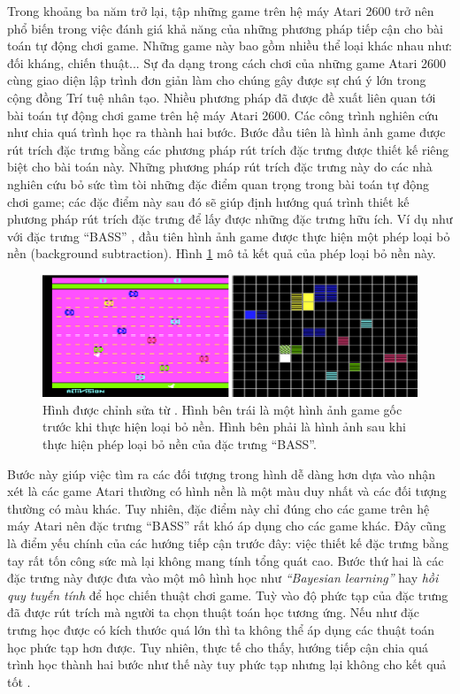 Trong khoảng ba năm trở lại, tập những game trên hệ máy Atari 2600 trở nên phổ biến trong việc đánh giá khả năng của những phương pháp tiếp cận cho bài toán tự động chơi game.
Những game này bao gồm nhiều thể loại khác nhau như: đối kháng, chiến thuật...
Sự đa dạng trong cách chơi của những game Atari 2600 cùng giao diện lập trình đơn giản làm cho chúng gây được sự chú ý lớn trong cộng đồng Trí tuệ nhân tạo.
Nhiều phương pháp đã được đề xuất liên quan tới bài toán tự động chơi game trên hệ máy Atari 2600. 
Các công trình nghiên cứu như \cite{bellemare2013bayesian, icml2014c2_bellemare14, bellemare2012arcade} chia quá trình học ra thành hai bước.
Bước đầu tiên là hình ảnh game được rút trích đặc trưng bằng các phương pháp rút trích đặc trưng được thiết kế riêng biệt cho bài toán này.
Những phương pháp rút trích đặc trưng này do các nhà nghiên cứu bỏ sức tìm tòi những đặc điểm quan trọng trong bài toán tự động chơi game; các đặc điểm này sau đó sẽ giúp định hướng quá trình thiết kế phương pháp rút trích đặc trưng để lấy được những đặc trưng hữu ích.
Ví dụ như với đặc trưng ``BASS'' \cite{bellemare2012arcade}, đầu tiên hình ảnh game được thực hiện một phép loại bỏ nền (background subtraction).
Hình \ref{fig_bass_feature} mô tả kết quả của phép loại bỏ nền này.
\begin{figure}
	\centering
	\includegraphics[width=\textwidth]{bass_feature}
	\caption[Phép loại bỏ nền của đặc trưng BASS]{Hình được chỉnh sửa từ \cite{bellemare2012arcade}.
	Hình bên trái là một hình ảnh game gốc trước khi thực hiện loại bỏ nền.
	Hình bên phải là hình ảnh sau khi thực hiện phép loại bỏ nền của đặc trưng ``BASS''.
	}
	\label{fig_bass_feature}
\end{figure}
Bước này giúp việc tìm ra các đối tượng trong hình dễ dàng hơn dựa vào nhận xét là các game Atari thường có hình nền là một màu duy nhất và các đối tượng thường có màu khác.
Tuy nhiên, đặc điểm này chỉ đúng cho các game trên hệ máy Atari nên đặc trưng ``BASS'' rất khó áp dụng cho các game khác.
Đây cũng là điểm yếu chính của các hướng tiếp cận trước đây: việc thiết kế đặc trưng bằng tay rất tốn công sức mà lại không mang tính tổng quát cao.
Bước thứ hai là các đặc trưng này được đưa vào một mô hình học như \textit{``Bayesian learning''} \cite{bellemare2013bayesian} hay \textit{hồi quy tuyến tính} \cite{bellemare2012arcade} để học chiến thuật chơi game.
Tuỳ vào độ phức tạp của đặc trưng đã được rút trích mà người ta chọn thuật toán học tương ứng.
Nếu như đặc trưng học được có kích thước quá lớn thì ta không thể áp dụng các thuật toán học phức tạp hơn được.
Tuy nhiên, thực tế cho thấy, hướng tiếp cận chia quá trình học thành hai bước như thế này tuy phức tạp nhưng lại không cho kết quả tốt \cite{mnih2013playing}.

